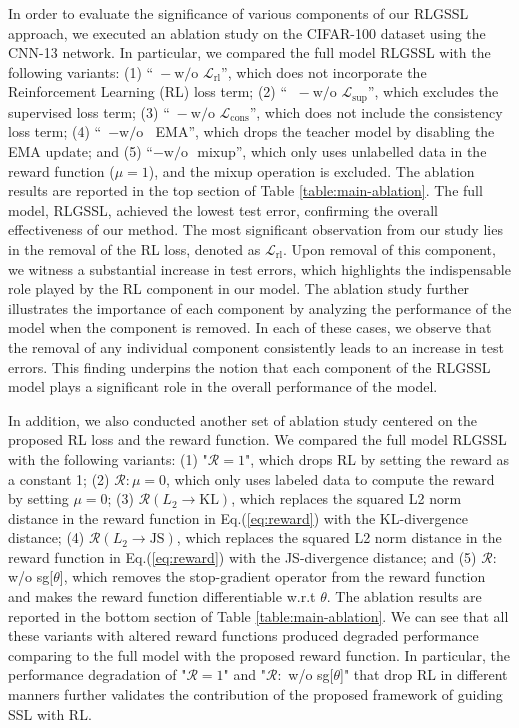 In order to evaluate the significance of various components of our RLGSSL approach, we executed an ablation study on the CIFAR-100 dataset using the CNN-13 network. 
In particular, we compared the full model RLGSSL with the following variants: 
(1) “$\; - \text{w/o } \mathcal{L}_\text{rl}$”, which does not incorporate the Reinforcement Learning (RL) loss term; 
(2) “ $\; - \text{w/o } \mathcal{L}_\text{sup}$”, which excludes 
the supervised loss term; 
(3) “$\; - \text{w/o } \mathcal{L}_\text{cons}$”, which  does not include the consistency loss term; 
(4) “$\; - \text{w/o }$ EMA”, which drops the teacher model 
by disabling the EMA update; 
and 
(5) “$-\text{w/o }$ mixup”, which only uses unlabelled data in the reward function ($\mu=1$), and the mixup operation is excluded.
The ablation results are reported in the top section of Table \ref{table:main-ablation}.
The full model, RLGSSL, achieved the lowest test error, confirming the overall effectiveness of our method. The most significant observation from our study lies in the removal of the RL loss, denoted as $\mathcal{L}_{\text{rl}}$. Upon removal of this component, we witness a substantial increase in test errors, which highlights the indispensable role played by the RL component in our model.  The ablation study further illustrates the importance of each component 
by analyzing the performance of the model when the component is removed. 
In each of these cases, we observe that the removal of any individual component consistently leads to an increase in test errors. This finding underpins the notion that each component of the RLGSSL model plays a significant role in the overall performance of the model.


In addition, we also conducted another set of ablation study centered on the proposed RL loss and the reward function.
We compared the full model RLGSSL with the following variants: 
(1) "$\mathcal{R}=1$", which drops RL by setting the reward as a constant 1;   
(2) $\mathcal{R}:\mu=0$, which only uses labeled data to compute the reward by setting $\mu=0$;   
(3) $\mathcal{R}(L_2\rightarrow\mbox{KL})$, 
which replaces the squared L2 norm distance in the reward function in Eq.(\ref{eq:reward}) 
with the KL-divergence distance; 
(4) $\mathcal{R}(L_2\rightarrow\mbox{JS})$,    
which replaces the squared L2 norm distance in the reward function in Eq.(\ref{eq:reward}) 
with the JS-divergence distance; 
and 
(5) $\mathcal{R}:$ w/o sg[$\theta$], which removes the stop-gradient operator from the reward function
and makes the reward function differentiable w.r.t $\theta$.
The ablation results are reported in the bottom section of Table \ref{table:main-ablation}.
We can see that all these variants with altered reward functions 
produced degraded performance comparing to the full model
with the proposed reward function. 
In particular, the performance degradation of "$\mathcal{R}=1$" and "$\mathcal{R}:$ w/o sg[$\theta$]" 
that drop RL in different manners
further validates the contribution of the proposed framework of guiding SSL with RL. 


